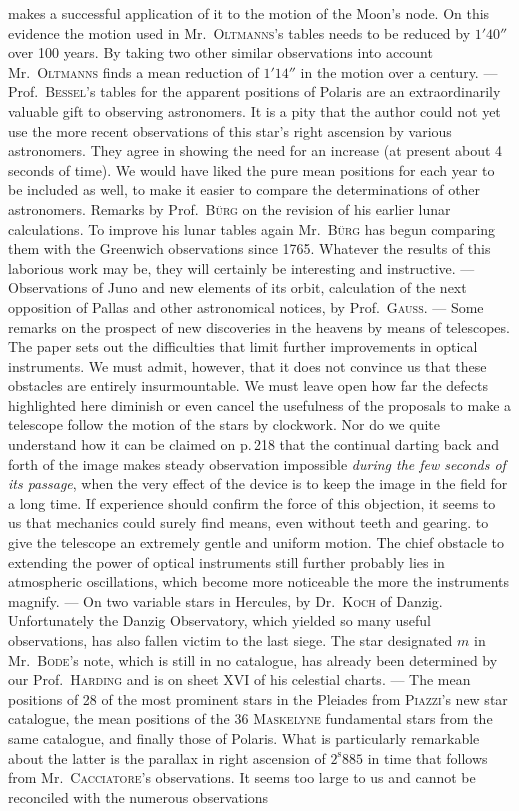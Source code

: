 makes a successful application of it to the motion of the Moon’s node. On this evidence the motion used in Mr.\ \textsc{Oltmanns}’s tables needs to be reduced by $1'40''$ over 100 years. By taking two other similar observations into account Mr.\ \textsc{Oltmanns} finds a mean reduction of $1'14''$ in the motion over a century. --- Prof.\ \textsc{Bessel}’s tables for the apparent positions of Polaris are an extraordinarily valuable gift to observing astronomers. It is a pity that the author could not yet use the more recent observations of this star’s right ascension by various astronomers. They agree in showing the need for an increase (at present about 4 seconds of time). We would have liked the pure mean positions for each year to be included as well, to make it easier to compare the determinations of other astronomers. Remarks by Prof.\ \textsc{Bürg} on the revision of his earlier lunar calculations. To improve his lunar tables again Mr.\ \textsc{Bürg} has begun comparing them with the Greenwich observations since 1765. Whatever the results of this laborious work may be, they will certainly be interesting and instructive. --- Observations of Juno and new elements of its orbit, calculation of the next opposition of Pallas and other astronomical notices, by Prof.\ \textsc{Gauss}. --- Some remarks on the prospect of new discoveries in the heavens by means of telescopes. The paper sets out the difficulties that limit further improvements in optical instruments. We must admit, however, that it does not convince us that these obstacles are entirely insurmountable. We must leave open how far the defects highlighted here diminish or even cancel the usefulness of the proposals to make a telescope follow the motion of the stars by clockwork. Nor do we quite understand how it can be claimed on p.\,218 that the continual darting back and forth of the image makes steady observation impossible \emph{during the few seconds of its passage}, when the very effect of the device is to keep the image in the field for a long time. If experience should confirm the force of this objection, it seems to us that mechanics could surely find means, even without teeth and gearing. to give the telescope an extremely gentle and uniform motion. The chief obstacle to extending the power of optical instruments still further probably lies in atmospheric oscillations, which become more noticeable the more the instruments magnify. --- On two variable stars in Hercules, by Dr.\ \textsc{Koch} of Danzig. Unfortunately the Danzig Observatory, which yielded so many useful observations, has also fallen victim to the last siege. The star designated $m$ in Mr.\ \textsc{Bode}’s note, which is still in no catalogue, has already been determined by our Prof.\ \textsc{Harding} and is on sheet XVI of his celestial charts. --- The mean positions of 28 of the most prominent stars in the Pleiades from \textsc{Piazzi}’s new star catalogue, the mean positions of the 36 \textsc{Maskelyne} fundamental stars from the same catalogue, and finally those of Polaris. What is particularly remarkable about the latter is the parallax in right ascension of $2^{\mathrm{s}}885$ in time that follows from Mr.\ \textsc{Cacciatore}’s observations. It seems too large to us and cannot be reconciled with the numerous observations 